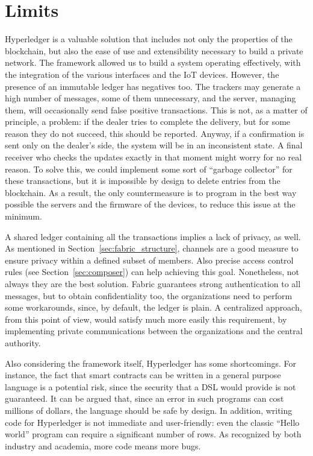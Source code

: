 \section{Limits}
Hyperledger is a valuable solution that includes not only the properties of the blockchain, but also the ease of use and extensibility necessary to build a private network. The framework allowed us to build a system operating effectively, with the integration of the various interfaces and the IoT devices. However, the presence of an immutable ledger has negatives too. The trackers may generate a high number of messages, some of them unnecessary, and the server, managing them, will occasionally send false positive transactions. This is not, as a matter of principle, a problem: if the dealer tries to complete the delivery, but for some reason they do not succeed, this should be reported. Anyway, if a confirmation is sent only on the dealer's side, the system will be in an inconsistent state. A final receiver who checks the updates exactly in that moment might worry for no real reason. To solve this, we could implement some sort of ``garbage collector'' for these transactions, but it is impossible by design to delete entries from the blockchain. As a result, the only countermeasure is to program in the best way possible the servers and the firmware of the devices, to reduce this issue at the minimum.

A shared ledger containing all the transactions implies a lack of privacy, as well. As mentioned in Section~\ref{sec:fabric_structure}, channels are a good measure to ensure privacy within a defined subset of members. Also precise access control rules (see Section~\ref{sec:composer}) can help achieving this goal. Nonetheless, not always they are the best solution. Fabric guarantees strong authentication to all messages, but to obtain confidentiality too, the organizations need to perform some workarounds, since, by default, the ledger is plain. A centralized approach, from this point of view, would satisfy much more easily this requirement, by implementing private communications between the organizations and the central authority.

Also considering the framework itself, Hyperledger has some shortcomings. For instance, the fact that smart contracts can be written in a general purpose language is a potential risk, since the security that a DSL would provide is not guaranteed. It can be argued that, since an error in such programs can cost millions of dollars, the language should be safe by design. In addition, writing code for Hyperledger is not immediate and user-friendly: even the classic ``Hello world'' program can require a significant number of rows. As recognized by both industry and academia, more code means more bugs.

